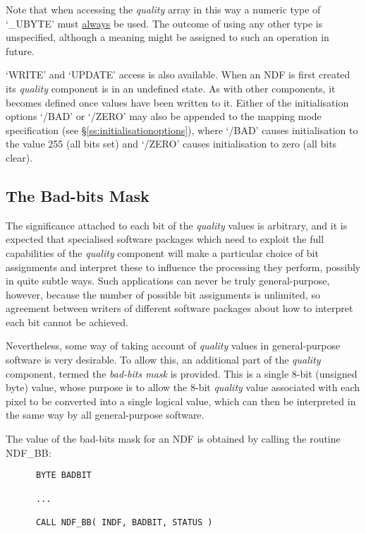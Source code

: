 \documentclass[twoside,11pt]{article}
\newcommand{\htmlref}[2]{#1}
\newcommand{\xlabel}[1]{}
\newcommand{\st}[1]{{\em{#1}}}
\begin{document}
Note that when accessing the \st{quality\/} array in this way a numeric type
of `\_UBYTE' must \underline{always} be used. 
The outcome of using any other type is unspecified, although a meaning might
be assigned to such an operation in future. 

`WRITE' and `UPDATE' access is also available.
When an NDF is first created its \st{quality\/} component is in an undefined
state.
As with other components, it becomes defined once values have been written
to it.
Either of the initialisation options `/BAD' or `/ZERO' may also be appended to
the mapping mode specification (see \S\ref{ss:initialisationoptions}), where
`/BAD' causes initialisation to the value 255 (all bits set) and `/ZERO'
causes initialisation to zero (all bits clear). 

\subsection{\xlabel{the_bad-bits_mask}The Bad-bits Mask}

The significance attached to each bit of the \st{quality\/} values is arbitrary,
and it is expected that specialised software packages which need to exploit the
full capabilities of the \st{quality\/} component will make a particular choice
of bit assignments and interpret these to influence the processing they perform,
possibly in quite subtle ways. 
Such applications can never be truly general-purpose, however, because the
number of possible bit assignments is unlimited, so agreement between
writers of different software packages about how to interpret each bit
cannot be achieved. 

Nevertheless, some way of taking account of \st{quality\/} values in
general-purpose software is very desirable. 
To allow this, an additional part of the \st{quality\/} component, termed the
\st{bad-bits mask\/} is provided.
This is a single 8-bit (unsigned byte) value, whose purpose is to allow the 
8-bit \st{quality\/} value associated with each pixel to be converted into a
single logical value, which can then be interpreted in the same way by all 
general-purpose software.

The value of the bad-bits mask for an NDF is obtained by calling the routine 
\htmlref{NDF\_BB}{NDF_BB}:

\small
\begin{verbatim}
      BYTE BADBIT

      ...

      CALL NDF_BB( INDF, BADBIT, STATUS )
\end{verbatim}
\normalsize
\end{document}
